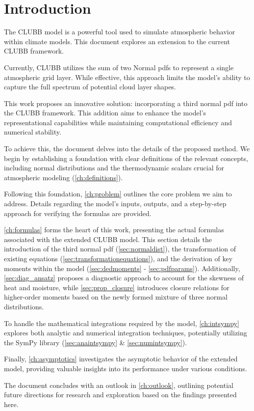 \chapter{Introduction}\label{ch:introduction}

The \gls{CLUBB} model is a powerful tool used to simulate atmospheric behavior within climate models.
This document explores an extension to the current \gls{CLUBB} framework.

Currently, \gls{CLUBB} utilizes the sum of two Normal \glspl{pdf} to represent a single atmospheric grid layer.
While effective, this approach limits the model's ability to capture the full spectrum of potential cloud layer shapes.

This work proposes an innovative solution: incorporating a third normal \gls{pdf} into the \gls{CLUBB} framework.
This addition aims to enhance the model's representational capabilities while maintaining computational efficiency and numerical stability.

To achieve this, the document delves into the details of the proposed method.
We begin by establishing a foundation with clear definitions of the relevant concepts, including normal distributions and the thermodynamic scalars crucial for atmospheric modeling (\autoref{ch:definitions}).

Following this foundation, \autoref{ch:problem} outlines the core problem we aim to address.
Details regarding the model's inputs, outputs, and a step-by-step approach for verifying the formulas are provided.

\autoref{ch:formulas} forms the heart of this work, presenting the actual formulas associated with the extended CLUBB model.
This section details the introduction of the third normal \gls{pdf} (\autoref{sec:normaldist}), the transformation of existing equations (\autoref{sec:transformationequations}), and the derivation of key moments within the model (\autoref{sec:dedmoments} - \autoref{sec:pdfparams}).
Additionally, \autoref{sec:diag_ansatz} proposes a diagnostic approach to account for the skewness of heat and moisture, while \autoref{sec:prop_closure} introduces closure relations for higher-order moments based on the newly formed mixture of three normal distributions.

To handle the mathematical integrations required by the model, \autoref{ch:intsympy} explores both analytic and numerical integration techniques, potentially utilizing the SymPy library (\autoref{sec:anaintsympy} \& \autoref{sec:numintsympy}).

Finally, \autoref{ch:asymptotics} investigates the asymptotic behavior of the extended model, providing valuable insights into its performance under various conditions.

The document concludes with an outlook in \autoref{ch:outlook}, outlining potential future directions for research and exploration based on the findings presented here.
